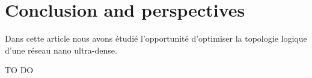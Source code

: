 \documentclass[sigconf]{acmart}
\begin{document}
\section{Conclusion and perspectives}
Dans cette article nous avons étudié l'opportunité d'optimiser la topologie logique d'une réseau nano ultra-dense. 
\begin{thebibliography}{1}

TO DO

\end{thebibliography}





\end{document}
